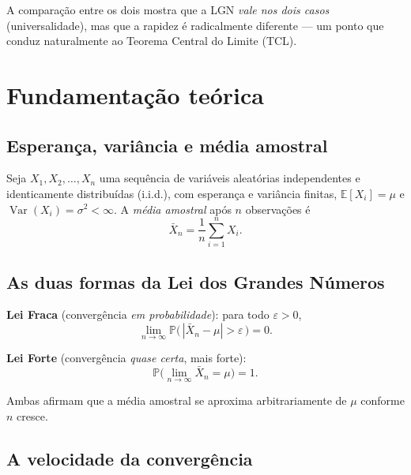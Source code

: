 \documentclass[12pt,a4paper]{article}
\newcommand{\E}{\mathbb{E}}
\newcommand{\Prob}{\mathbb{P}}
\newcommand{\Var}{\operatorname{Var}}
\begin{document}
A comparação entre os dois mostra que a LGN \emph{vale nos dois casos}
(universalidade), mas que a rapidez é radicalmente diferente --- um ponto que conduz
naturalmente ao Teorema Central do Limite (TCL).

\section{Fundamentação teórica}

\subsection{Esperança, variância e média amostral}

Seja $X_1, X_2, \dots, X_n$ uma sequência de variáveis aleatórias independentes e
identicamente distribuídas (i.i.d.), com esperança e variância finitas,
$\E[X_i] = \mu$ e $\Var(X_i) = \sigma^2 < \infty$. A \emph{média amostral} após $n$
observações é
\begin{equation}
  \bar{X}_n = \frac{1}{n}\sum_{i=1}^{n} X_i .
\end{equation}

\subsection{As duas formas da Lei dos Grandes Números}

\textbf{Lei Fraca} (convergência \emph{em probabilidade}): para todo $\varepsilon > 0$,
\begin{equation}
  \lim_{n\to\infty} \Prob\!\big(\,|\bar{X}_n - \mu| > \varepsilon\,\big) = 0 .
\end{equation}

\textbf{Lei Forte} (convergência \emph{quase certa}, mais forte):
\begin{equation}
  \Prob\!\Big(\lim_{n\to\infty} \bar{X}_n = \mu\Big) = 1 .
\end{equation}

Ambas afirmam que a média amostral se aproxima arbitrariamente de $\mu$ conforme $n$
cresce.

\subsection{A velocidade da convergência}
\end{document}
